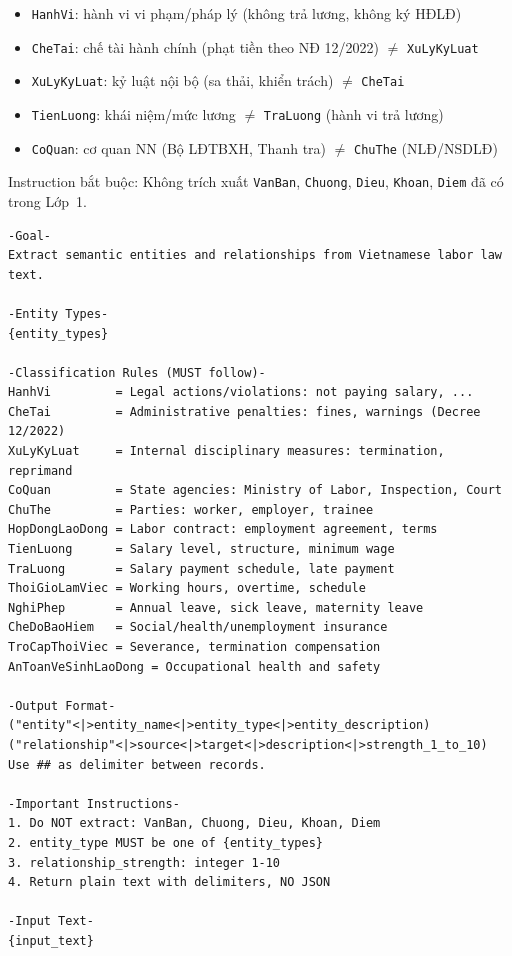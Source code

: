 \documentclass[../DoAn.tex]{subfiles}
\begin{document}
\begin{itemize}[nosep, leftmargin=*]
    \item \texttt{HanhVi}: hành vi vi phạm/pháp lý (không trả lương, không ký HĐLĐ)
    \item \texttt{CheTai}: chế tài hành chính (phạt tiền theo NĐ 12/2022) $\neq$ \texttt{XuLyKyLuat}
    \item \texttt{XuLyKyLuat}: kỷ luật nội bộ (sa thải, khiển trách) $\neq$ \texttt{CheTai}
    \item \texttt{TienLuong}: khái niệm/mức lương $\neq$ \texttt{TraLuong} (hành vi trả lương)
    \item \texttt{CoQuan}: cơ quan NN (Bộ LĐTBXH, Thanh tra) $\neq$ \texttt{ChuThe} (NLĐ/NSDLĐ)
\end{itemize}

Instruction bắt buộc: Không trích xuất \texttt{VanBan}, \texttt{Chuong}, \texttt{Dieu}, \texttt{Khoan}, \texttt{Diem} đã có trong Lớp~1.

\begin{lstlisting}[caption={Prompt \texttt{extract\_graph\_simple.txt}},label={lst:extract-graph-prompt},basicstyle=\ttfamily\small,breaklines=true,frame=single]
-Goal-
Extract semantic entities and relationships from Vietnamese labor law text.

-Entity Types-
{entity_types}

-Classification Rules (MUST follow)-
HanhVi         = Legal actions/violations: not paying salary, ...
CheTai         = Administrative penalties: fines, warnings (Decree 12/2022)
XuLyKyLuat     = Internal disciplinary measures: termination, reprimand
CoQuan         = State agencies: Ministry of Labor, Inspection, Court
ChuThe         = Parties: worker, employer, trainee
HopDongLaoDong = Labor contract: employment agreement, terms
TienLuong      = Salary level, structure, minimum wage
TraLuong       = Salary payment schedule, late payment
ThoiGioLamViec = Working hours, overtime, schedule
NghiPhep       = Annual leave, sick leave, maternity leave
CheDoBaoHiem   = Social/health/unemployment insurance
TroCapThoiViec = Severance, termination compensation
AnToanVeSinhLaoDong = Occupational health and safety

-Output Format-
("entity"<|>entity_name<|>entity_type<|>entity_description)
("relationship"<|>source<|>target<|>description<|>strength_1_to_10)
Use ## as delimiter between records.

-Important Instructions-
1. Do NOT extract: VanBan, Chuong, Dieu, Khoan, Diem
2. entity_type MUST be one of {entity_types}
3. relationship_strength: integer 1-10
4. Return plain text with delimiters, NO JSON

-Input Text-
{input_text}
\end{lstlisting}
\end{document}
